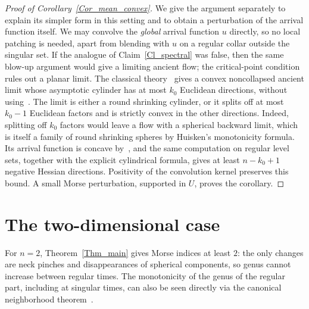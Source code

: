 \documentclass[12pt,twoside,reqno]{amsart}
\theoremstyle{definition}
\theoremstyle{remark}
\numberwithin{equation}{section}
\begin{document}
\begin{proof}[Proof of Corollary~\ref{Cor_mean_convex}]
We give the argument separately to explain its simpler form in this setting and to obtain a perturbation of the arrival function itself.
We may convolve the \emph{global} arrival function $u$ directly, so no local patching is needed, apart from blending with $u$ on a regular collar outside the singular set.
If the analogue of Claim~\ref{Cl_spectral} was false, then the same blow-up argument would give a limiting ancient flow; the critical-point condition rules out a planar limit.
The classical theory~\cite{WhiteNature,WhiteSubsequent,HaslhoferKleiner} gives a convex noncollapsed ancient limit whose asymptotic cylinder has at most $k_0$ Euclidean directions, without using~\cite{BamlerLai}.
The limit is either a round shrinking cylinder, or it splits off at most $k_0-1$ Euclidean factors and is strictly convex in the other directions.
Indeed, splitting off $k_0$ factors would leave a flow with a spherical backward limit, which is itself a family of round shrinking spheres by Huisken's monotonicity formula.
Its arrival function is concave by~\cite[Proposition~3.2]{BourniLangfordLynch}, and the same computation on regular level sets, together with the explicit cylindrical formula, gives at least $n-k_0+1$ negative Hessian directions.
Positivity of the convolution kernel preserves this bound.
A small Morse perturbation, supported in $U$, proves the corollary.
\end{proof}

\section{The two-dimensional case}

For $n=2$, Theorem~\ref{Thm_main} gives Morse indices at least $2$: the only changes are neck pinches and disappearances of spherical components, so genus cannot increase between regular times.
The monotonicity of the genus of the regular part, including at singular times, can also be seen directly via the canonical neighborhood theorem~\cite[Corollary~1.18]{ChoiHaslhoferHershkovitsWhite}.
\end{document}

